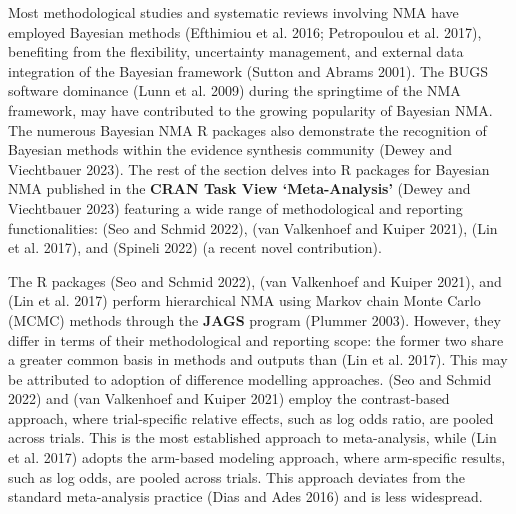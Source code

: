 Most methodological studies and systematic reviews involving NMA have employed Bayesian methods (Efthimiou et al. 2016; Petropoulou et al. 2017), benefiting from the flexibility, uncertainty management, and external data integration of the Bayesian framework (Sutton and Abrams 2001). The BUGS software dominance (Lunn et al. 2009) during the springtime of the NMA framework, may have contributed to the growing popularity of Bayesian NMA. The numerous Bayesian NMA R packages also demonstrate the recognition of Bayesian methods within the evidence synthesis community (Dewey and Viechtbauer 2023). The rest of the section delves into R packages for
Bayesian NMA published in the \textbf{CRAN Task View `Meta-Analysis'} (Dewey and Viechtbauer 2023)
featuring a wide range of methodological and reporting functionalities:  (Seo and Schmid 2022),
 (van Valkenhoef and Kuiper 2021),  (Lin et al. 2017), and 
(Spineli 2022) (a recent novel contribution).

The R packages  (Seo and Schmid 2022),  (van Valkenhoef and Kuiper 2021), and 
(Lin et al. 2017) perform hierarchical NMA using Markov chain Monte Carlo (MCMC) methods
through the \textbf{JAGS} program (Plummer 2003). However, they differ in terms of their
methodological and reporting scope: the former two share a greater common basis in methods and outputs
than  (Lin et al. 2017). This may be attributed to adoption of difference modelling approaches.
 (Seo and Schmid 2022) and  (van Valkenhoef and Kuiper 2021) employ the contrast-based approach, where
trial-specific relative effects, such as log odds ratio, are
pooled across trials. This is the most established approach to meta-analysis, while
 (Lin et al. 2017) adopts the arm-based modeling approach, where
arm-specific results, such as log odds, are pooled across trials. This approach
deviates from the standard meta-analysis practice (Dias and Ades 2016) and is less widespread.

